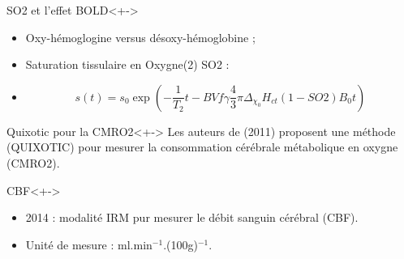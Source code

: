 \begin{frame}
\begin{block}{SO2 et l'effet BOLD}<+->
\begin{itemize}
\item<+-> Oxy-h\'emoglogine versus d\'esoxy-h\'emoglobine ;
\item<+-> Saturation tissulaire en Oxygne(2) SO2 :
\item<+-> \[s(t)=s_0\exp\left(-\frac{1}{T_2}t-BVf\gamma\frac{4}{3}\pi\Delta_{\chi_0}H_{ct}(1-SO2)B_0t\right)\]
\end{itemize}
\end{block}
\end{frame}

\begin{frame}
\begin{block}{Quixotic pour la CMRO2}<+->
Les auteurs de \cite{quixotic} (2011) proposent une m\'ethode (QUIXOTIC) pour mesurer la consommation c\'er\'ebrale m\'etabolique en oxygne (CMRO2).
\end{block}

\begin{block}{CBF}<+->
\begin{itemize}
\item<+-> 2014 : modalit\'e IRM pur mesurer le d\'ebit sanguin c\'er\'ebral (CBF).
\item<+-> Unit\'e de mesure : ml.min${}^{-1}$.(100g)${}^{-1}$.
\end{itemize}
\end{block}
\end{frame}


